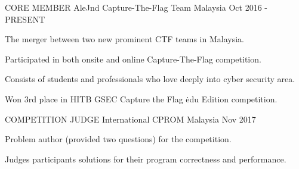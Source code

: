 

\begin{cventries}

    \cventry
    {CORE MEMBER}
    {AleJnd Capture-The-Flag Team}
    {Malaysia}
    {Oct 2016 - PRESENT}
    {
      \begin{cvitems}
        \item {The merger between two new prominent CTF teams in Malaysia.}
        \item {Participated in both onsite and online Capture-The-Flag competition.}
        \item {Consists of students and professionals who love deeply into cyber security area.}
        \item {Won 3rd place in HITB GSEC Capture the Flag \.edu Edition competition.}
      \end{cvitems}
    }

    \cventry
    {COMPETITION JUDGE}
    {International CPROM}
    {Malaysia}
    {Nov 2017}
    {
      \begin{cvitems}
        \item {Problem author (provided two questions) for the competition.}
        \item {Judges participants solutions for their program correctness and performance.}
      \end{cvitems}
    }
\end{cventries}
